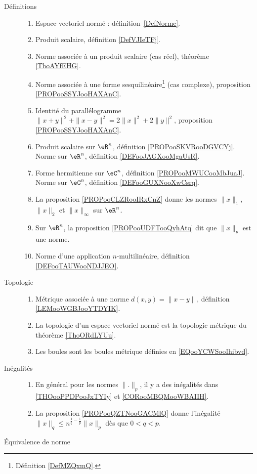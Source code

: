      \label{THEMEooUJVXooZdlmHj}

\begin{description}
	\item[Définitions]
	      \begin{enumerate}
		      \item
		            Espace vectoriel normé : définition~\ref{DefNorme}.
		      \item
		            Produit scalaire, définition \ref{DefVJIeTFj}.
		      \item
		            Norme associée à un produit scalaire (cas réel), théorème \ref{ThoAYfEHG}.
		      \item
		            Norme associée à une forme sesquilinéaire\footnote{Définition \ref{DefMZQxmQ}.} (cas complexe), proposition \ref{PROPooSSYJooHAXAnC}.
		      \item
		            Identité du parallélogramme \( \| x+y \|^2+\| x-y \|^2=2\| x \|^2+2\| y \|^2\), proposition \ref{PROPooSSYJooHAXAnC}.
		      \item
		            Produit scalaire sur \( \eR^n\), définition \ref{PROPooSKVRooDGVCYj}. Norme sur \( \eR^n\), définition \ref{DEFooJAGXooMgaUsR}.
		      \item
		            Forme hermitienne sur \( \eC^n\), définition \ref{PROPooMWUCooMbJuaJ}. Norme sur \( \eC^n\), définition \ref{DEFooGUXNooXwCsrq}.
		      \item
		            La proposition \ref{PROPooCLZRooIRxCnZ} donne les normes \( \| x \|_1\), \( \| x \|_2\) et \( \| x \|_{\infty}\) sur \( \eR^n\).
		      \item
		            Sur \( \eR^n\), la proposition \ref{PROPooUDFTooQyhAtq} dit que \( \| x \|_p\) est une norme.
		      \item
		            Norme d'une application \( n\)-multilinéaire, définition \ref{DEFooTAUWooNDJJEO}.
	      \end{enumerate}
	\item[Topologie]
	      \begin{enumerate}
		      \item
		            Métrique associée à une norme \( d(x,y)=\| x-y \|\), définition \ref{LEMooWGBJooYTDYIK}.
		      \item
		            La topologie d'un espace vectoriel normé est la topologie métrique du théorème \ref{ThoORdLYUu}.
		      \item
		            Les boules sont les boules métrique définies en \eqref{EQooYCWSooIhibvd}.
	      \end{enumerate}
	\item[Inégalités]
	      \begin{enumerate}
		      \item
		            En général pour les normes \( \| . \|_p\), il y a des inégalités dans \ref{THOooPPDPooJxTYIy} et \ref{CORooMBQMooWBAIIH}.
		      \item
		            La proposition \ref{PROPooQZTNooGACMlQ} donne l'inégalité \( \| x \|_q\leq n^{\frac{1}{ q }-\frac{1}{ p }}\| x \|_p\) dès que \( 0<q<p\).
	      \end{enumerate}
	\item[Équivalence de norme]


\end{description}
